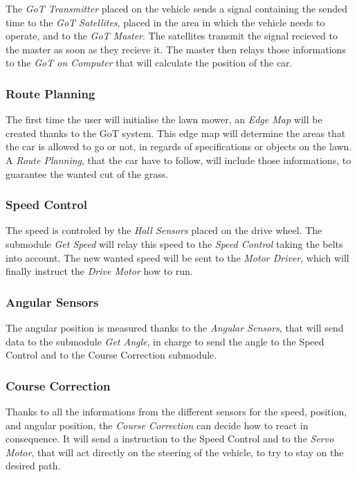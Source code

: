 The \textit{GoT Transmitter} placed on the vehicle sends a signal containing the sended time to the \textit{GoT Satellites}, placed in the area in which the vehicle needs to operate, and to the \textit{GoT Master}. The satellites transmit the signal recieved to the master as soon as they recieve it. The master then relays those informations to the \textit{GoT on Computer} that will calculate the position of the car.


\subsubsection{Route Planning}
The first time the user will initialise the lawn mower, an \textit{Edge Map} will be created thanks to the GoT system. This edge map will determine the areas that the car is allowed to go or not, in regards of specifications or objects on the lawn. A \textit{Route Planning}, that the car have to follow, will include those informations, to guarantee the wanted cut of the grass. 


\subsubsection{Speed Control}
The speed is controled by the \textit{Hall Sensors} placed on the drive wheel. The submodule \textit{Get Speed} will relay this speed to the \textit{Speed Control} taking the belts into account. The new wanted speed will be sent to the \textit{Motor Driver}, which will finally instruct the \textit{Drive Motor} how to run.


\subsubsection{Angular Sensors}
The angular position is measured thanks to the \textit{Angular Sensors}, that will send data to the submodule \textit{Get Angle}, in charge to send the angle to the Speed Control and to the Course Correction submodule.

\subsubsection{Course Correction}
Thanks to all the informations from the different sensors for the speed, position, and angular position, the \textit{Course Correction} can decide how to react in consequence. It will send a instruction to the Speed Control and to the \textit{Servo Motor}, that will act directly on the steering of the vehicle, to try to stay on the desired path.

